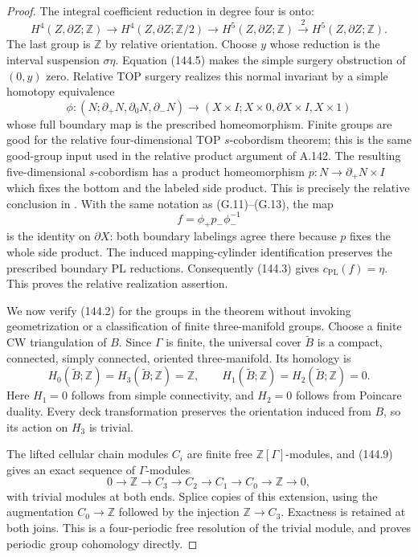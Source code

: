 \begin{proof}
The integral coefficient reduction in degree four is onto:
\[
 H^4(Z,\partial Z;\mathbb Z)\longrightarrow
 H^4(Z,\partial Z;\mathbb Z/2)\longrightarrow
 H^5(Z,\partial Z;\mathbb Z)
            \xrightarrow{\,2\,}H^5(Z,\partial Z;\mathbb Z).
 \tag{144.6}
\]
The last group is $\mathbb Z$ by relative orientation. Choose $y$
whose reduction is the interval suspension $\sigma\eta$.
Equation (144.5) makes the simple surgery obstruction of $(0,y)$
zero. Relative TOP surgery realizes this normal invariant by a
simple homotopy equivalence
\[
 \phi:(N;\partial_+N,\partial_0N,\partial_-N)
 \longrightarrow
 (X\times I;X\times0,\partial X\times I,X\times1)
 \tag{144.7}
\]
whose full boundary map is the prescribed homeomorphism.
Finite groups are good for the relative four-dimensional TOP
$s$-cobordism theorem; this is the same good-group input used in the
relative product argument of A.142. The resulting five-dimensional
$s$-cobordism has a product homeomorphism
$p:N\to\partial_+N\times I$ which fixes the bottom and the labeled
side product. This is precisely the relative conclusion in
\cite[Proposition 4.10 and its diagram, printed pp.~2526--2527]
{Galvin2026}. With the same notation as (G.11)--(G.13), the map
\[
                  f=\phi_+p_-\phi_-^{-1}
 \tag{144.8}
\]
is the identity on $\partial X$: both boundary labelings agree there
because $p$ fixes the whole side product. The induced
mapping-cylinder identification preserves the prescribed boundary
PL reductions. Consequently (144.3) gives
$c_{\mathrm{PL}}(f)=\eta$. This proves the relative realization
assertion.

We now verify (144.2) for the groups in the theorem without invoking
geometrization or a classification of finite three-manifold groups.
Choose a finite CW triangulation of $B$. Since $\Gamma$ is finite,
the universal cover $\widetilde B$ is a compact, connected, simply
connected, oriented three-manifold. Its homology is
\[
 H_0(\widetilde B;\mathbb Z)=H_3(\widetilde B;\mathbb Z)=\mathbb Z,
       \qquad H_1(\widetilde B;\mathbb Z)
              =H_2(\widetilde B;\mathbb Z)=0.
 \tag{144.9}
\]
Here $H_1=0$ follows from simple connectivity, and $H_2=0$ follows
from Poincare duality. Every deck transformation preserves the
orientation induced from $B$, so its action on $H_3$ is trivial.

The lifted cellular chain modules $C_i$ are finite free
$\mathbb Z[\Gamma]$-modules, and (144.9) gives an exact sequence of
$\Gamma$-modules
\[
 0\longrightarrow\mathbb Z\longrightarrow C_3
   \longrightarrow C_2\longrightarrow C_1
   \longrightarrow C_0\longrightarrow\mathbb Z
   \longrightarrow0,
 \tag{144.10}
\]
with trivial modules at both ends. Splice copies of this extension,
using the augmentation $C_0\to\mathbb Z$ followed by the injection
$\mathbb Z\to C_3$. Exactness is retained at both joins. This is a
four-periodic free resolution of the trivial module, and proves
periodic group cohomology directly.


\end{proof}

